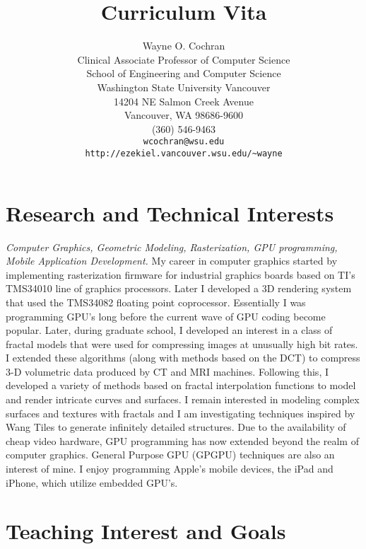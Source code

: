 \documentclass[10pt]{article}
\title{Curriculum Vita}
\author{Wayne O. Cochran\\
       Clinical Associate Professor of Computer Science\\
       School of Engineering and Computer Science\\
       Washington State University Vancouver\\
       14204 NE Salmon Creek Avenue\\
       Vancouver, WA 98686-9600\\
       (360) 546-9463\\
       {\tt wcochran@wsu.edu} \\
       {\tt http://ezekiel.vancouver.wsu.edu/\~{}wayne}}
\begin{document}
\maketitle




\section*{Research and Technical Interests}

{\em Computer Graphics, Geometric Modeling, Rasterization, 
GPU programming, Mobile Application Development.}
My career in computer graphics started by 
implementing rasterization firmware
for industrial graphics boards based on
TI's TMS34010 line of graphics processors.
Later I developed a 3D rendering system
that used the TMS34082 floating  point coprocessor.
Essentially I was programming GPU's long before
the current wave of GPU coding become popular.
Later, during graduate school, I developed an interest
in a class of fractal models that were used for compressing
images at unusually high bit rates. I extended these
algorithms (along with methods based on the DCT)
to compress 3-D volumetric data produced by CT
and MRI machines. Following this, I developed a variety of methods
based on fractal interpolation functions to model
and render intricate curves and surfaces.
I remain interested in modeling 
complex surfaces and textures with fractals and I am
investigating techniques inspired by
Wang Tiles to generate infinitely detailed structures.
Due to the availability of cheap video hardware,
GPU programming
has now extended beyond the realm of computer graphics.
General Purpose GPU (GPGPU) techniques are also
an interest of mine.
I enjoy programming Apple's mobile devices, the iPad and iPhone,
which utilize embedded GPU's.

\section*{Teaching Interest and Goals}
\end{document}
